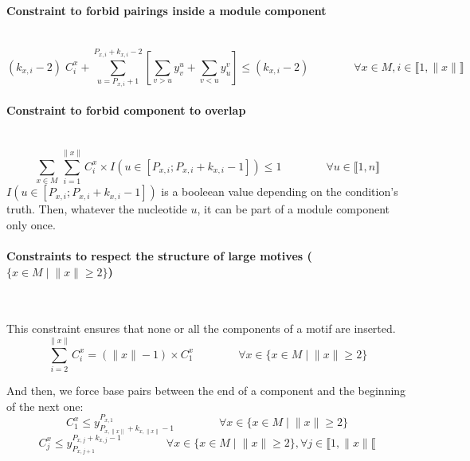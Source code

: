 \documentclass{article}
\begin{document}
\paragraph{Constraint to forbid pairings inside a module component} ~ 
\begin{equation} \label{constraint:4}
	(k_{x,i}-2) \; C^x_i + \sum_{u=P_{x,i}+1}^{P_{x,i}+k_{x,i}-2}\left[ \sum_{v>u} y^u_v + \sum_{v<u} y^v_u \right] \leq (k_{x,i} - 2)
	\qquad \qquad \forall x \in M, i \in \llbracket 1,\|x\| \rrbracket
\end{equation}
	
\paragraph{Constraint to forbid component to overlap} ~
\begin{equation} \label{constraint:5}
	\sum_{x \in M} \sum_{i=1}^{\|x\|} C^x_i \times I( u \in [ P_{x,i} ; P_{x,i}+k_{x,i}-1]) \leq 1 \qquad \qquad \forall u \in \llbracket 1,n \rrbracket
\end{equation}
$I( u \in [ P_{x,i} ; P_{x,i}+k_{x,i}-1])$ is a booleean value depending on the condition's truth. Then, whatever the nucleotide $u$, it can be part of a module component only once.
	
\paragraph{Constraints to respect the structure of large motives ($\{ x\in M \; | \; \|x\| \geq 2\}$)} ~ 

This constraint ensures that none or all the components of a motif are inserted.
\begin{equation}\label{constraint:6}
	\sum_{i=2}^{\|x\|} C^x_i = (\|x\| - 1) \times C^{x}_{1}	 \qquad \qquad \forall x \in \{ x\in M \; | \; \|x\| \geq 2\}
\end{equation}

And then, we force base pairs between the end of a component and the beginning of the next one:
\begin{equation}\label{constraint:7}
	C^x_1 \leq y^{P_{x,1}}_{P_{x,\|x\|}+k_{x,\|x\|}-1} \qquad \qquad \forall x \in \{ x\in M \; | \; \|x\| \geq 2\}
\end{equation}
\begin{equation}\label{constraint:8}
	C^x_j \leq y^{P_{x,j}+k_{x,j}-1}_{P_{x,j+1}} \qquad \qquad \forall x \in \{ x\in M \; | \; \|x\| \geq 2\}, \forall j \in \llbracket 1,\|x\| \llbracket
\end{equation}
\end{document}
